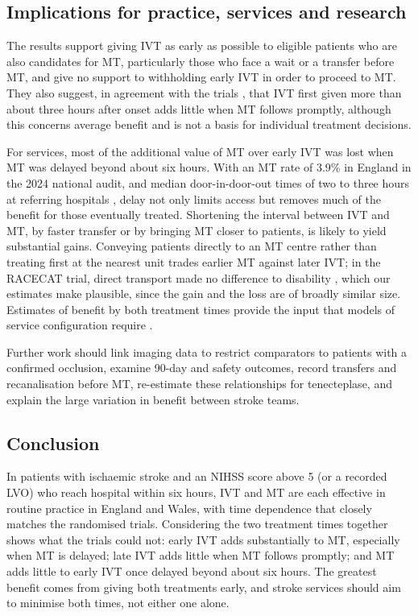 \subsection{Implications for practice, services and research}

The results support giving IVT as early as possible to eligible patients who are also candidates for MT, particularly those who face a wait or a transfer before MT, and give no support to withholding early IVT in order to proceed to MT. They also suggest, in agreement with the trials \cite{kaesmacher2024,tnkplus2026}, that IVT first given more than about three hours after onset adds little when MT follows promptly, although this concerns average benefit and is not a basis for individual treatment decisions.

For services, most of the additional value of MT over early IVT was lost when MT was delayed beyond about six hours. With an MT rate of 3.9\% in England in the 2024 national audit, and median door-in-door-out times of two to three hours at referring hospitals \cite{nagaratnam2025}, delay not only limits access but removes much of the benefit for those eventually treated. Shortening the interval between IVT and MT, by faster transfer or by bringing MT closer to patients, is likely to yield substantial gains. Conveying patients directly to an MT centre rather than treating first at the nearest unit trades earlier MT against later IVT; in the RACECAT trial, direct transport made no difference to disability \cite{perezdelaossa2022}, which our estimates make plausible, since the gain and the loss are of broadly similar size. Estimates of benefit by both treatment times provide the input that models of service configuration require \cite{allen2022}.

Further work should link imaging data to restrict comparators to patients with a confirmed occlusion, examine 90-day and safety outcomes, record transfers and recanalisation before MT, re-estimate these relationships for tenecteplase, and explain the large variation in benefit between stroke teams.

\subsection{Conclusion}

In patients with ischaemic stroke and an NIHSS score above 5 (or a recorded LVO) who reach hospital within six hours, IVT and MT are each effective in routine practice in England and Wales, with time dependence that closely matches the randomised trials. Considering the two treatment times together shows what the trials could not: early IVT adds substantially to MT, especially when MT is delayed; late IVT adds little when MT follows promptly; and MT adds little to early IVT once delayed beyond about six hours. The greatest benefit comes from giving both treatments early, and stroke services should aim to minimise both times, not either one alone.
